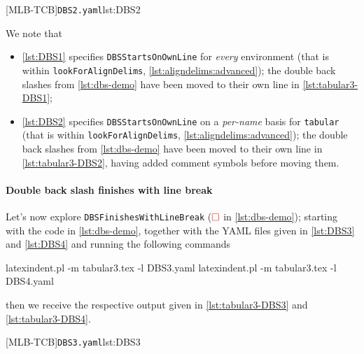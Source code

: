 		\begin{cmhtcbraster}[raster column skip=.01\linewidth]
			{\texttt{DBS2.yaml}}{lst:DBS2}
		\end{cmhtcbraster}

		We note that
		\begin{itemize}
			\item \cref{lst:DBS1} specifies \texttt{DBSStartsOnOwnLine} for
			      \emph{every} environment (that is within \texttt{lookForAlignDelims},
			      \vref{lst:aligndelims:advanced});
			      the double back slashes from \cref{lst:dbs-demo} have been moved to their own line in
			      \cref{lst:tabular3-DBS1};
			\item \cref{lst:DBS2} specifies \texttt{DBSStartsOnOwnLine} on a
			      \emph{per-name} basis for \texttt{tabular} (that is within \texttt{lookForAlignDelims},
			      \vref{lst:aligndelims:advanced});
			      the double back slashes from \cref{lst:dbs-demo} have been moved to their own line in
			      \cref{lst:tabular3-DBS2}, having added comment symbols before moving them.
		\end{itemize}

	\paragraph{Double back slash finishes with line break}
		Let's now explore \texttt{DBSFinishesWithLineBreak} ($\color{red}\square$ in
		\cref{lst:dbs-demo}); starting with the code in \cref{lst:dbs-demo}, together with the
		YAML files given in \cref{lst:DBS3} and \cref{lst:DBS4} and running the following
		commands
		\begin{commandshell}
latexindent.pl -m tabular3.tex -l DBS3.yaml
latexindent.pl -m tabular3.tex -l DBS4.yaml
\end{commandshell}
		then we receive the respective output given in \cref{lst:tabular3-DBS3} and
		\cref{lst:tabular3-DBS4}.

		\begin{cmhtcbraster}[raster column skip=.01\linewidth]
			{\texttt{DBS3.yaml}}{lst:DBS3}
		\end{cmhtcbraster}

